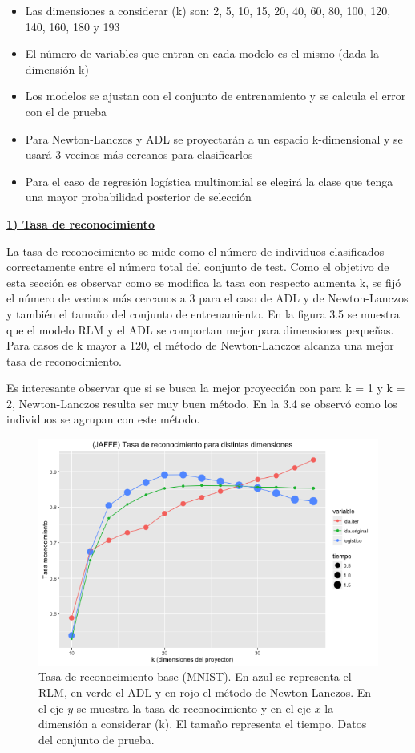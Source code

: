 \begin{itemize}
\item Las dimensiones a considerar (k) son: 2, 5, 10, 15, 20, 40, 60, 80, 100, 120, 140, 160, 180 y 193
\item El número de variables que entran en cada modelo es el mismo (dada la dimensión k)
\item Los modelos se ajustan con el conjunto de entrenamiento y se calcula el error con el de prueba
\item Para Newton-Lanczos y ADL se proyectarán a un espacio k-dimensional y se usará 3-vecinos más cercanos para clasificarlos
\item Para el caso de regresión logística multinomial se elegirá la clase que tenga una mayor probabilidad posterior de selección
\end{itemize}

\underline{\textbf{1) Tasa de reconocimiento}}

La tasa de reconocimiento se mide como el número de individuos clasificados correctamente entre el número total del conjunto de test. Como el objetivo de esta sección es observar como se modifica la tasa con respecto aumenta k, se fijó el número de vecinos más cercanos a 3 para el caso de ADL y de Newton-Lanczos y también el tamaño del conjunto de entrenamiento. En la figura 3.5 se muestra que el modelo RLM y el ADL se comportan mejor para dimensiones pequeñas. Para casos de k mayor a 120, el método de Newton-Lanczos alcanza una mejor tasa de reconocimiento.

Es interesante observar que si se busca la mejor proyección con para k = 1 y k = 2, Newton-Lanczos resulta ser muy buen método. En la 3.4 se observó como los individuos se agrupan con este método. 


\begin{figure}[!ht] \label{fig5.5}
  \centering
	\includegraphics[width=1\textwidth]{Figures/Chapter4_Comparacion.png}	
  \caption[Tasa de reconocimiento base (MNIST).]
  {Tasa de reconocimiento base (MNIST). En azul se representa el RLM, en verde el ADL y en rojo el método de Newton-Lanczos. En el eje $y$ se muestra la tasa de reconocimiento y en el eje $x$ la dimensión a considerar (k). El tamaño representa el tiempo. Datos del conjunto de prueba.}
\end{figure}


